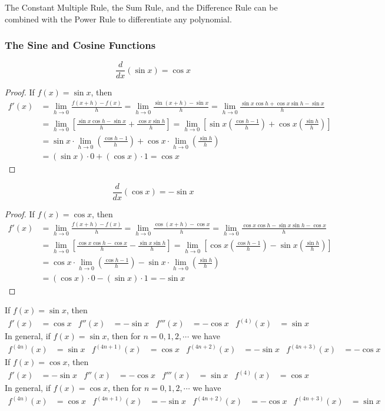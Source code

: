 The Constant Multiple Rule, the Sum Rule, and the Difference Rule can be
combined with the Power Rule to differentiate any polynomial.

\subsubsection*{The Sine and Cosine Functions}
\[\frac{d}{dx}(\sin x)=\cos x\]
\begin{proof}
    If \(f(x)=\sin x\), then
    \begin{align*}
        f'(x) &= \lim_{h\to 0}\frac{f(x+h)-f(x)}{h}
        =\lim_{h\to 0}\frac{\sin(x+h)-\sin x}{h}
        =\lim_{h\to 0}\frac{\sin x\cos h+\cos x\sin h-\sin x}{h} \\
        &= \lim_{h\to 0}
        \left[\frac{\sin x\cos h-\sin x}{h}+\frac{\cos x\sin h}{h}\right]
        =\lim_{h\to 0}
        \left[\sin x\left(\frac{\cos h-1}{h}\right)
        +\cos x\left(\frac{\sin h}{h}\right)\right] \\
        &= \sin x\cdot\lim_{h\to 0}\left(\frac{\cos h-1}{h}\right)
        +\cos x\cdot\lim_{h\to 0}\left(\frac{\sin h}{h}\right) \\
        &=(\sin x)\cdot 0+(\cos x)\cdot 1=\cos x
    \end{align*}
\end{proof}
\[\frac{d}{dx}(\cos x)=-\sin x\]
\begin{proof}
    If \(f(x)=\cos x\), then
    \begin{align*}
        f'(x) &= \lim_{h\to 0}\frac{f(x+h)-f(x)}{h}
        =\lim_{h\to 0}\frac{\cos(x+h)-\cos x}{h}
        =\lim_{h\to 0}\frac{\cos x\cos h-\sin x\sin h-\cos x}{h} \\
        &= \lim_{h\to 0}
        \left[\frac{\cos x\cos h-\cos x}{h}-\frac{\sin x\sin h}{h}\right]
        =\lim_{h\to 0}
        \left[\cos x\left(\frac{\cos h-1}{h}\right)
        -\sin x\left(\frac{\sin h}{h}\right)\right] \\
        &= \cos x\cdot\lim_{h\to 0}\left(\frac{\cos h-1}{h}\right)
        -\sin x\cdot\lim_{h\to 0}\left(\frac{\sin h}{h}\right) \\
        &=(\cos x)\cdot 0-(\sin x)\cdot 1=-\sin x
    \end{align*}
\end{proof}
If \(f(x)=\sin x\), then
\begin{align*}
    f'(x) &= \cos x & f''(x) &= -\sin x & f'''(x) &= -\cos x
    & f^{(4)}(x) &= \sin x
\end{align*}
In general, if \(f(x)=\sin x\), then for \(n=0,1,2,\cdots\) we have
\begin{align*}
    f^{(4n)}(x) &= \sin x & f^{(4n+1)}(x) &= \cos x & f^{(4n+2)}(x) &= -\sin x
    & f^{(4n+3)}(x) &= -\cos x
\end{align*}
If \(f(x)=\cos x\), then
\begin{align*}
    f'(x) &= -\sin x & f''(x) &= -\cos x & f'''(x) &= \sin x
    & f^{(4)}(x) &= \cos x
\end{align*}
In general, if \(f(x)=\cos x\), then for \(n=0,1,2,\cdots\) we have
\begin{align*}
    f^{(4n)}(x) &= \cos x & f^{(4n+1)}(x) &= -\sin x
    & f^{(4n+2)}(x) &= -\cos x
    & f^{(4n+3)}(x) &= \sin x
\end{align*}
